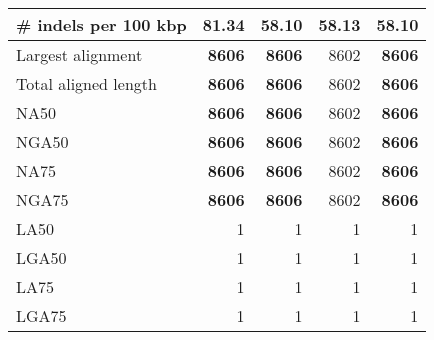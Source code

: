 \documentclass[12pt,a4paper]{article}
\begin{document}
\begin{table}[ht]
\begin{center}
\begin{tabular}{|l*{4}{|r}|}
\# indels per 100 kbp & 81.34 & {\bf 58.10} & 58.13 & {\bf 58.10} \\ \hline
Largest alignment & {\bf 8606} & {\bf 8606} & 8602 & {\bf 8606} \\ \hline
Total aligned length & {\bf 8606} & {\bf 8606} & 8602 & {\bf 8606} \\ \hline
NA50 & {\bf 8606} & {\bf 8606} & 8602 & {\bf 8606} \\ \hline
NGA50 & {\bf 8606} & {\bf 8606} & 8602 & {\bf 8606} \\ \hline
NA75 & {\bf 8606} & {\bf 8606} & 8602 & {\bf 8606} \\ \hline
NGA75 & {\bf 8606} & {\bf 8606} & 8602 & {\bf 8606} \\ \hline
LA50 & 1 & 1 & 1 & 1 \\ \hline
LGA50 & 1 & 1 & 1 & 1 \\ \hline
LA75 & 1 & 1 & 1 & 1 \\ \hline
LGA75 & 1 & 1 & 1 & 1 \\ \hline
\end{tabular}
\end{center}
\end{table}
\end{document}
